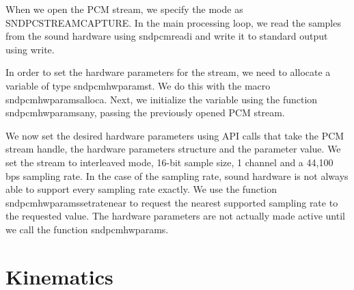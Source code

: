 \documentclass{article}
\begin{document}
When we open the PCM stream, we specify the mode as SND\textunderscore PC\textunderscore STREAM\textunderscore CAPTURE. In the main processing loop, we read the samples from the sound hardware using snd\textunderscore pcm\textunderscore readi and write it to standard output using write. 

In order to set the hardware parameters for the stream, we need to allocate a variable of type snd\textunderscore pcm\textunderscore hw\textunderscore params\textunderscore t. We do this with the macro snd\textunderscore pcm\textunderscore hw\textunderscore params\textunderscore alloca. Next, we initialize the variable using the function snd\textunderscore pcm\textunderscore hw\textunderscore params\textunderscore any, passing the previously opened PCM stream. 

We now set the desired hardware parameters using API calls that take the PCM stream handle, the hardware parameters structure and the parameter value. We set the stream to interleaved mode, 16-bit sample size, 1 channel and a 44,100 bps sampling rate. In the case of the sampling rate, sound hardware is not always able to support every sampling rate exactly. We use the function snd\textunderscore pcm\textunderscore hw\textunderscore params\textunderscore set\textunderscore rate\textunderscore near to request the nearest supported sampling rate to the requested value. The hardware parameters are not actually made active until we call the function snd\textunderscore pcm\textunderscore hw\textunderscore params.

\section{Kinematics}
\end{document}

